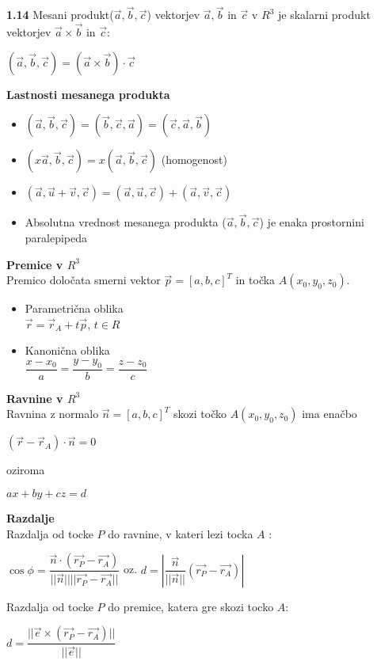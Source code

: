 \documentclass{article}
\begin{document}
\begin{multicols}{2}
\textbf{1.14} Mesani produkt($\vec{a}, \vec{b}, \vec{c}$) vektorjev
$\vec{a}, \vec{b}$ in $\vec{c}$ v $R^{3}$ je skalarni produkt vektorjev
$\vec{a} \times \vec{b}$ in $\vec{c}$:
\begin{center}
	$(\vec{a}, \vec{b}, \vec{c}) = (\vec{a} \times \vec{b})\cdot \vec{c}$
\end{center}

\textbf{Lastnosti mesanega produkta}
\begin{itemize}
	\item $(\vec{a}, \vec{b}, \vec{c}) = (\vec{b}, \vec{c}, \vec{a}) = (\vec{c}, \vec{a}, \vec{b})$
	\item $(x\vec{a}, \vec{b}, \vec{c}) = x(\vec{a}, \vec{b}, \vec{c})$ (homogenost)
	\item $(\vec{a}, \vec{u} + \vec{v}, \vec{c}) = (\vec{a}, \vec{u}, \vec{c}) + (\vec{a}, \vec{v}, \vec{c})$
	\item Absolutna vrednost mesanega produkta ($\vec{a}, \vec{b}, \vec{c}$) je enaka prostornini paralepipeda
\end{itemize}

\textbf{Premice v $R^{3}$} \\
Premico določata smerni vektor $\vec{p} = [a, b, c]^{T}$ in točka $A(x_0, y_0, z_0)$.
\begin{itemize}
	\item Parametrična oblika\\
	      $\vec{r} = \vec{r}_{A} + t\vec{p}$, $t \in R$
	      \vfill\null
	      \columnbreak
	\item Kanonična oblika\\
	      $\dfrac{x - x_{0}}{a} = \dfrac{y - y_{0}}{b} = \dfrac{z - z_{0}}{c}$
\end{itemize}

\textbf{Ravnine v $R^{3}$} \\
Ravnina z normalo $\vec{n} = [a, b, c]^T$ skozi točko $A(x_0, y_0, z_0)$ ima enačbo
\begin{center}
	$(\vec{r} - \vec{r}_A) \cdot \vec{n} = 0$
\end{center}
oziroma
\begin{center}
	$ax + by + cz = d$
\end{center}

\textbf{Razdalje}\\
Razdalja od tocke $P$ do ravnine, v kateri lezi tocka $A$ :
\begin{center}
	$\cos\phi = \dfrac{\vec{n} \cdot ( \vec{r_{P}} - \vec{r_{A}})} {||\vec{n}|| ||\vec{r_{P}} - \vec{r_{A}}||}$ oz.
	$d = |\dfrac{\vec{n}}{||\vec{n}||} ( \vec{r_{P}} - \vec{r_{A}})|$
\end{center}
Razdalja od tocke $P$ do premice, katera gre skozi tocko $A$:
\begin{center}
	$d = \dfrac{||\vec{e} \times ( \vec{r_{P}} - \vec{r_{A}})||}{||\vec{e}||}$
\end{center}


\end{multicols}
\end{document}
